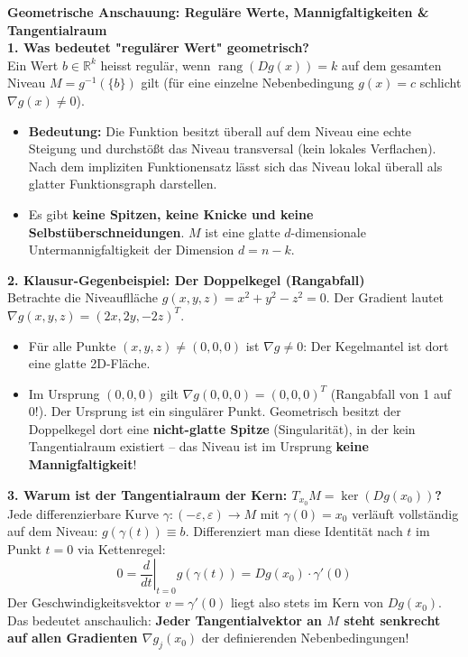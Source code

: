\begin{remark}
    \textbf{Geometrische Anschauung: Reguläre Werte, Mannigfaltigkeiten \& Tangentialraum} \\
    \textbf{1. Was bedeutet "regulärer Wert" geometrisch?} \\
    Ein Wert $b \in \mathbb{R}^k$ heisst regulär, wenn $\operatorname{rang}(Dg(x)) = k$ auf dem gesamten Niveau $M = g^{-1}(\{b\})$ gilt (für eine einzelne Nebenbedingung $g(x) = c$ schlicht $\nabla g(x) \neq 0$).
    \begin{itemize}
        \item \textbf{Bedeutung:} Die Funktion besitzt überall auf dem Niveau eine echte Steigung und durchstößt das Niveau transversal (kein lokales Verflachen). Nach dem impliziten Funktionensatz lässt sich das Niveau lokal überall als glatter Funktionsgraph darstellen.
        \item Es gibt \textbf{keine Spitzen, keine Knicke und keine Selbstüberschneidungen}. $M$ ist eine glatte $d$-dimensionale Untermannigfaltigkeit der Dimension $d = n - k$.
    \end{itemize}

    \textbf{2. Klausur-Gegenbeispiel: Der Doppelkegel (Rangabfall)} \\
    Betrachte die Niveauflläche $g(x, y, z) = x^2 + y^2 - z^2 = 0$.
    Der Gradient lautet $\nabla g(x, y, z) = (2x, 2y, -2z)^T$.
    \begin{itemize}
        \item Für alle Punkte $(x, y, z) \neq (0, 0, 0)$ ist $\nabla g \neq 0$: Der Kegelmantel ist dort eine glatte 2D-Fläche.
        \item Im Ursprung $(0, 0, 0)$ gilt $\nabla g(0, 0, 0) = (0, 0, 0)^T$ (Rangabfall von 1 auf 0!). Der Ursprung ist ein singulärer Punkt. Geometrisch besitzt der Doppelkegel dort eine \textbf{nicht-glatte Spitze} (Singularität), in der kein Tangentialraum existiert – das Niveau ist im Ursprung \textbf{keine Mannigfaltigkeit}!
    \end{itemize}

    \textbf{3. Warum ist der Tangentialraum der Kern: $T_{x_0} M = \ker(Dg(x_0))$?} \\
    Jede differenzierbare Kurve $\gamma: (-\varepsilon, \varepsilon) \to M$ mit $\gamma(0) = x_0$ verläuft vollständig auf dem Niveau: $g(\gamma(t)) \equiv b$. Differenziert man diese Identität nach $t$ im Punkt $t = 0$ via Kettenregel:
    $$ 0 = \left. \frac{d}{dt} \right|_{t=0} g(\gamma(t)) = Dg(x_0) \cdot \gamma'(0) $$
    Der Geschwindigkeitsvektor $v = \gamma'(0)$ liegt also stets im Kern von $Dg(x_0)$. Das bedeutet anschaulich: \textbf{Jeder Tangentialvektor an $M$ steht senkrecht auf allen Gradienten $\nabla g_j(x_0)$} der definierenden Nebenbedingungen!
\end{remark}

